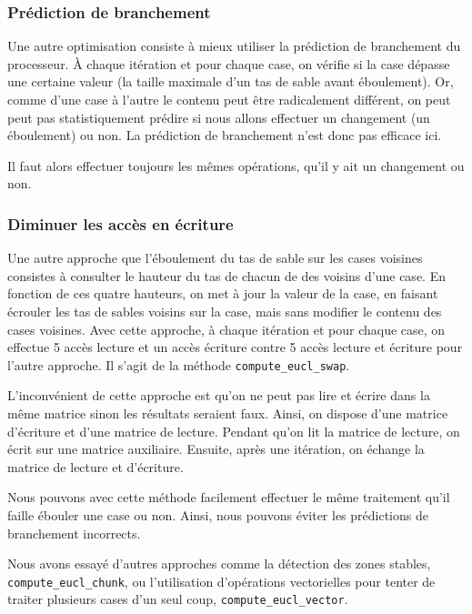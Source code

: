 \subsubsection{Prédiction de branchement}

Une autre optimisation consiste à mieux utiliser la prédiction de
branchement du processeur. À chaque itération et pour chaque case, on
vérifie si la case dépasse une certaine valeur (la taille maximale
d'un tas de sable avant éboulement). Or, comme d'une case à l'autre le
contenu peut être radicalement différent, on peut peut pas
statistiquement prédire si nous allons effectuer un changement (un
éboulement) ou non. La prédiction de branchement n'est donc pas
efficace ici.
\medskip

Il faut alors effectuer toujours les mêmes opérations, qu'il y ait
un changement ou non.
\medskip

\subsubsection{Diminuer les accès en écriture}

Une autre approche que l'éboulement du tas de sable sur les cases
voisines consistes à consulter le hauteur du tas de chacun de des
voisins d'une case. En fonction de ces quatre hauteurs, on met à jour
la valeur de la case, en faisant écrouler les tas de sables voisins
sur la case, mais sans modifier le contenu des cases voisines. Avec
cette approche, à chaque itération et pour chaque case, on effectue 5
accès lecture et un accès écriture contre 5 accès lecture et écriture
pour l'autre approche. Il s'agit de la méthode
\texttt{compute\_eucl\_swap}.
\medskip

L'inconvénient de cette approche est qu'on ne peut pas lire et écrire
dans la même matrice sinon les résultats seraient faux. Ainsi, on
dispose d'une matrice d'écriture et d'une matrice de lecture. Pendant
qu'on lit la matrice de lecture, on écrit sur une matrice
auxiliaire. Ensuite, après une itération, on échange la matrice de
lecture et d'écriture.
\medskip

Nous pouvons avec cette méthode facilement effectuer le même
traitement qu'il faille ébouler une case ou non. Ainsi, nous pouvons
éviter les prédictions de branchement incorrects.
\bigskip

Nous avons essayé d'autres approches comme la détection des zones
stables, \texttt{compute\_\-eucl\_\-chunk}, ou l'utilisation
d'opérations vectorielles pour tenter de traiter plusieurs cases d'un
seul coup, \texttt{compute\_\-eucl\_\-vector}.
\medskip

